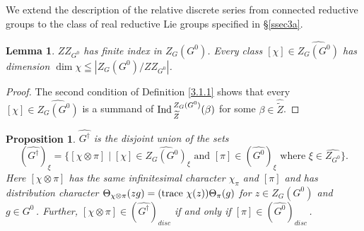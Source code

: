 \documentclass{conm-p-l}
\newtheorem{lemma}[equation]{Lemma}
\newtheorem{proposition}[equation]{Proposition}
\def\trace{{\rm trace\,\,}}
\def\Ind{{\rm Ind\,}}
\begin{document}
\subsection{}\label{ssec3e}
\setcounter{equation}{0}
We extend the description of the relative discrete series from connected
reductive groups to the class of real reductive Lie groups 
specified in \S \ref{ssec3a}.

\begin{lemma}\label{3.5.1}
$ZZ_{G^0}$ has finite index in $Z_G(G^0)$.  Every class 
$[\chi] \in \widehat{Z_G(G^0)}$ has dimension 
$\dim \chi \leqq |Z_G(G^0)/ZZ_{G^0}|$.
\end{lemma}

\begin{proof} The second condition of Definition \ref{3.1.1} shows that every 
$[\chi] \in \widehat{Z_G(G^0)}$ is a summand of 
$\Ind_{\widetilde{Z}}^{Z_G(G^0)}(\beta)$ for some 
$\beta \in \widehat{\widetilde{Z}}$.
\end{proof}

\begin{proposition}\label{3.5.2}
$\widehat{G^\dagger}$ is the disjoint union of the sets
\begin{equation}\label{3.5.3}
(\widehat{G^\dagger})_\xi = \{[\chi\otimes\pi] \mid 
	[\chi] \in \widehat{Z_G(G^0)}_\xi \text{ and }
	[\pi] \in (\widehat{G^0})_\xi \text{ where } \xi \in \widehat{Z_{G^0}}\}.
\end{equation}
Here $[\chi\otimes\pi]$ has the same infinitesimal character $\chi_\pi$
and $[\pi]$ and has distribution character $\Theta_{\chi\otimes\pi}(zg) =
(\trace \chi(z))\Theta_\pi(g)$ for $z \in Z_G(G^0)$ and $g \in G^0$\,.
Further, $[\chi\otimes\pi] \in (\widehat{G^\dagger})_{disc}$ if and only if
$[\pi] \in (\widehat{G^0})_{disc}$\,.
\end{proposition}
\end{document}
